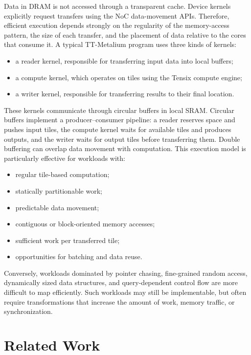 Data in DRAM is not accessed through a transparent cache. Device kernels explicitly request transfers using the NoC data-movement APIs. Therefore, efficient execution depends strongly on the regularity of the memory-access pattern, the size of each transfer, and the placement of data relative to the cores that consume it.
\newline
A typical TT-Metalium program uses three kinds of kernels:
\begin{itemize}
\item a reader kernel, responsible for transferring input data into local buffers;
\item a compute kernel, which operates on tiles using the Tensix compute engine;
\item a writer kernel, responsible for transferring results to their final location.
\end{itemize}

These kernels communicate through circular buffers in local SRAM. Circular buffers implement a producer--consumer pipeline: a reader reserves space and pushes input tiles, the compute kernel waits for available tiles and produces outputs, and the writer waits for output tiles before transferring them. Double buffering can overlap data movement with computation.
\newline
This execution model is particularly effective for workloads with:
\begin{itemize}
\item regular tile-based computation;
\item statically partitionable work;
\item predictable data movement;
\item contiguous or block-oriented memory accesses;
\item sufficient work per transferred tile;
\item opportunities for batching and data reuse.
\end{itemize}

Conversely, workloads dominated by pointer chasing, fine-grained random access, dynamically sized data structures, and query-dependent control flow are more difficult to map efficiently. Such workloads may still be implementable, but often require transformations that increase the amount of work, memory traffic, or synchronization.

\section{Related Work}
\label{sec:related-work}

